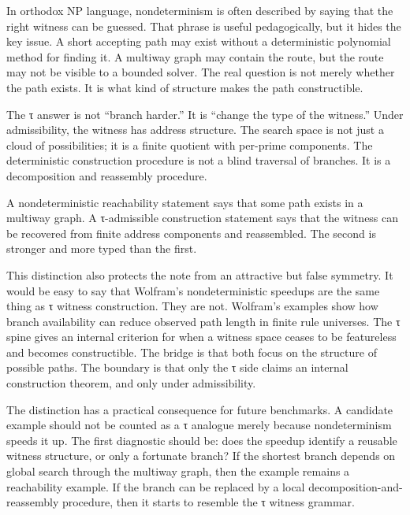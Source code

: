 \documentclass{pantarhei-researchnote}
\begin{document}
In orthodox NP language, nondeterminism is often described by saying that
the right witness can be guessed. That phrase is useful pedagogically, but
it hides the key issue. A short accepting path may exist without a
deterministic polynomial method for finding it. A multiway graph may
contain the route, but the route may not be visible to a bounded solver.
The real question is not merely whether the path exists. It is what kind
of structure makes the path constructible.

The τ answer is not ``branch harder.'' It is ``change the type of the
witness.'' Under admissibility, the witness has address structure. The
search space is not just a cloud of possibilities; it is a finite
quotient with per-prime components. The deterministic construction
procedure is not a blind traversal of branches. It is a decomposition and
reassembly procedure.

\begin{remark}
A nondeterministic reachability statement says that some path exists in a
multiway graph. A τ-admissible construction statement says that the
witness can be recovered from finite address components and reassembled.
The second is stronger and more typed than the first.
\end{remark}

This distinction also protects the note from an attractive but false
symmetry. It would be easy to say that Wolfram's nondeterministic speedups
are the same thing as τ witness construction. They are not. Wolfram's
examples show how branch availability can reduce observed path length in
finite rule universes. The τ spine gives an internal criterion for when a
witness space ceases to be featureless and becomes constructible. The
bridge is that both focus on the structure of possible paths. The
boundary is that only the τ side claims an internal construction theorem,
and only under admissibility.

The distinction has a practical consequence for future benchmarks. A
candidate example should not be counted as a τ analogue merely because
nondeterminism speeds it up. The first diagnostic should be: does the
speedup identify a reusable witness structure, or only a fortunate
branch? If the shortest branch depends on global search through the
multiway graph, then the example remains a reachability example. If the
branch can be replaced by a local decomposition-and-reassembly procedure,
then it starts to resemble the τ witness grammar.
\end{document}

